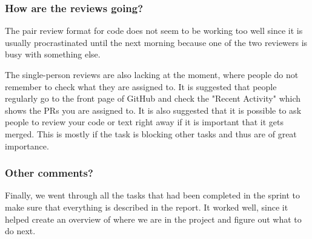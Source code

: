 \subsubsection*{How are the reviews going?}
The pair review format for code does not seem to be working too well since it is usually procrastinated until the next morning because one of the two reviewers is busy with something else.

The single-person reviews are also lacking at the moment, where people do not remember to check what they are assigned to.
It is suggested that people regularly go to the front page of GitHub and check the "Recent Activity" which shows the PRs you are assigned to.
It is also suggested that it is possible to ask people to review your code or text right away if it is important that it gets merged.
This is mostly if the task is blocking other tasks and thus are of great importance.


\subsubsection*{Other comments?}
Finally, we went through all the tasks that had been completed in the sprint to make sure that everything is described in the report.
It worked well, since it helped create an overview of where we are in the project and figure out what to do next.